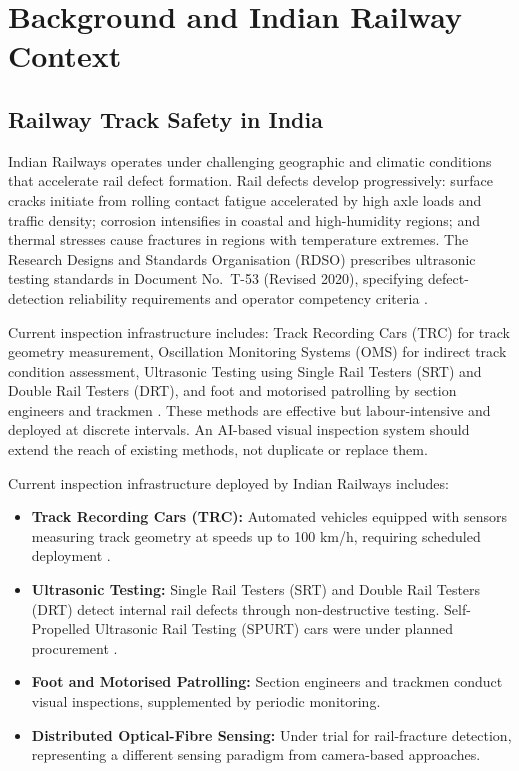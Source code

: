 \documentclass[conference]{IEEE}
\begin{document}
\section{Background and Indian Railway Context}
\label{sec:background}

\subsection{Railway Track Safety in India}

Indian Railways operates under challenging geographic and climatic conditions that accelerate rail defect formation. Rail defects develop progressively: surface cracks initiate from rolling contact fatigue accelerated by high axle loads and traffic density; corrosion intensifies in coastal and high-humidity regions; and thermal stresses cause fractures in regions with temperature extremes. The Research Designs and Standards Organisation (RDSO) prescribes ultrasonic testing standards in Document No.\ T-53 (Revised 2020), specifying defect-detection reliability requirements and operator competency criteria \cite{rdso2020}.

Current inspection infrastructure includes: Track Recording Cars (TRC) for track geometry measurement, Oscillation Monitoring Systems (OMS) for indirect track condition assessment, Ultrasonic Testing using Single Rail Testers (SRT) and Double Rail Testers (DRT), and foot and motorised patrolling by section engineers and trackmen \cite{pib2017}. These methods are effective but labour-intensive and deployed at discrete intervals. An AI-based visual inspection system should extend the reach of existing methods, not duplicate or replace them.

Current inspection infrastructure deployed by Indian Railways includes:

\begin{itemize}
    \item \textbf{Track Recording Cars (TRC):} Automated vehicles equipped with sensors measuring track geometry at speeds up to 100 km/h, requiring scheduled deployment \cite{pib2017}.
    \item \textbf{Ultrasonic Testing:} Single Rail Testers (SRT) and Double Rail Testers (DRT) detect internal rail defects through non-destructive testing. Self-Propelled Ultrasonic Rail Testing (SPURT) cars were under planned procurement \cite{pib2017}.
    \item \textbf{Foot and Motorised Patrolling:} Section engineers and trackmen conduct visual inspections, supplemented by periodic monitoring.
    \item \textbf{Distributed Optical-Fibre Sensing:} Under trial for rail-fracture detection, representing a different sensing paradigm from camera-based approaches.
\end{itemize}
\end{document}
